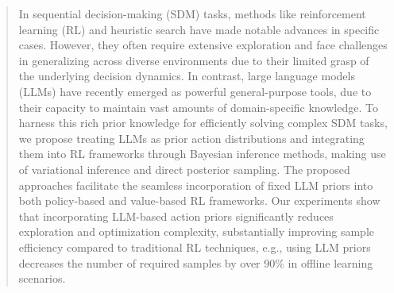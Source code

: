 \documentclass{article} %
\theoremstyle{plain}
\theoremstyle{definition}
\theoremstyle{remark}
\newcommand{\yan}[1]{{ \color{blue}[yan: #1]}}
\begin{document}
\begin{abstract}
In sequential decision-making (SDM) tasks, methods like reinforcement learning (RL) and heuristic search have made notable advances in specific cases. However, they often require extensive exploration and face challenges in generalizing across diverse environments due to their limited grasp of the underlying decision dynamics. In contrast, large language models (LLMs) have recently emerged as powerful general-purpose tools, due to their capacity to maintain vast amounts of domain-specific knowledge. To harness this rich prior knowledge for efficiently solving complex SDM tasks, we propose treating LLMs as prior action distributions and integrating them into RL frameworks through Bayesian inference methods, making use of variational inference and direct posterior sampling. The proposed approaches facilitate the seamless incorporation of fixed LLM priors into both policy-based and value-based RL frameworks. Our experiments show that incorporating LLM-based action priors significantly reduces exploration and optimization complexity, substantially improving sample efficiency compared to traditional RL techniques, e.g., using LLM priors decreases the number of required samples by over 90\% in offline learning scenarios.



\end{abstract}
\end{document}
